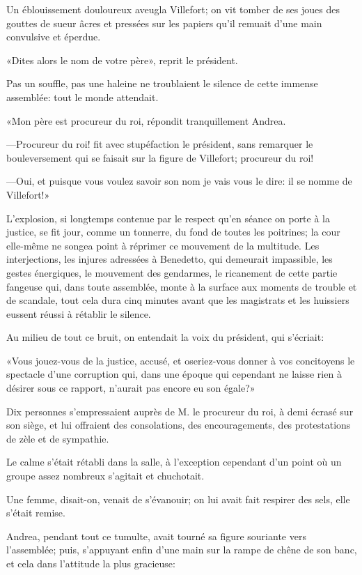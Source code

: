 Un éblouissement douloureux aveugla Villefort; on vit tomber de ses joues des gouttes de sueur âcres et pressées sur les papiers qu'il remuait d'une main convulsive et éperdue. 

«Dites alors le nom de votre père», reprit le président. 

Pas un souffle, pas une haleine ne troublaient le silence de cette immense assemblée: tout le monde attendait. 

«Mon père est procureur du roi, répondit tranquillement Andrea. 

—Procureur du roi! fit avec stupéfaction le président, sans remarquer le bouleversement qui se faisait sur la figure de Villefort; procureur du roi! 

—Oui, et puisque vous voulez savoir son nom je vais vous le dire: il se nomme de Villefort!» 

L'explosion, si longtemps contenue par le respect qu'en séance on porte à la justice, se fit jour, comme un tonnerre, du fond de toutes les poitrines; la cour elle-même ne songea point à réprimer ce mouvement de la multitude. Les interjections, les injures adressées à Benedetto, qui demeurait impassible, les gestes énergiques, le mouvement des gendarmes, le ricanement de cette partie fangeuse qui, dans toute assemblée, monte à la surface aux moments de trouble et de scandale, tout cela dura cinq minutes avant que les magistrats et les huissiers eussent réussi à rétablir le silence. 

Au milieu de tout ce bruit, on entendait la voix du président, qui s'écriait: 

«Vous jouez-vous de la justice, accusé, et oseriez-vous donner à vos concitoyens le spectacle d'une corruption qui, dans une époque qui cependant ne laisse rien à désirer sous ce rapport, n'aurait pas encore eu son égale?» 

Dix personnes s'empressaient auprès de M. le procureur du roi, à demi écrasé sur son siège, et lui offraient des consolations, des encouragements, des protestations de zèle et de sympathie. 

Le calme s'était rétabli dans la salle, à l'exception cependant d'un point où un groupe assez nombreux s'agitait et chuchotait. 

Une femme, disait-on, venait de s'évanouir; on lui avait fait respirer des sels, elle s'était remise. 

Andrea, pendant tout ce tumulte, avait tourné sa figure souriante vers l'assemblée; puis, s'appuyant enfin d'une main sur la rampe de chêne de son banc, et cela dans l'attitude la plus gracieuse: 

